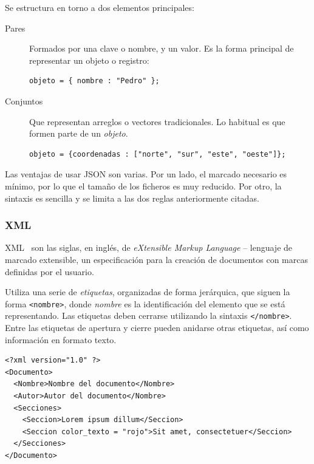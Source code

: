 Se estructura en torno a dos elementos principales:
\begin{description}
\item[Pares] Formados por una clave o nombre, y un valor. Es la forma principal
  de representar un objeto o registro:
  \begin{verbatim}
objeto = { nombre : "Pedro" };    
  \end{verbatim}
\item[Conjuntos] Que representan arreglos o vectores tradicionales. Lo habitual
  es que formen parte de un \textit{objeto}.
  \begin{verbatim}
objeto = {coordenadas : ["norte", "sur", "este", "oeste"]};
  \end{verbatim}
\end{description}

Las ventajas de usar JSON son varias. Por un lado, el marcado necesario es
mínimo, por lo que el tamaño de los ficheros es muy reducido. Por otro, la
sintaxis es sencilla y se limita a las dos reglas anteriormente citadas.

\subsubsection{XML}
\label{sec:diseno_xml}
\acs{XML}~\cite{XMLSpec} son las siglas, en inglés, de \textit{eXtensible Markup
  Language} -- lenguaje de marcado extensible, un especificación para la
creación de documentos con marcas definidas por el usuario.

Utiliza una serie de \textit{etiquetas}, organizadas de forma jerárquica, que
siguen la forma \texttt{<nombre>}, donde \textit{nombre} es la identificación
del elemento que se está representando. Las etiquetas deben cerrarse utilizando
la sintaxis \texttt{</nombre>}. Entre las etiquetas de apertura y cierre pueden
anidarse otras etiquetas, así como información en formato texto.

\begin{verbatim}
<?xml version="1.0" ?>
<Documento>
  <Nombre>Nombre del documento</Nombre>
  <Autor>Autor del documento</Nombre>
  <Secciones>
    <Seccion>Lorem ipsum dillum</Seccion>
    <Seccion color_texto = "rojo">Sit amet, consectetuer</Seccion>
  </Secciones>
</Documento>  
\end{verbatim}

